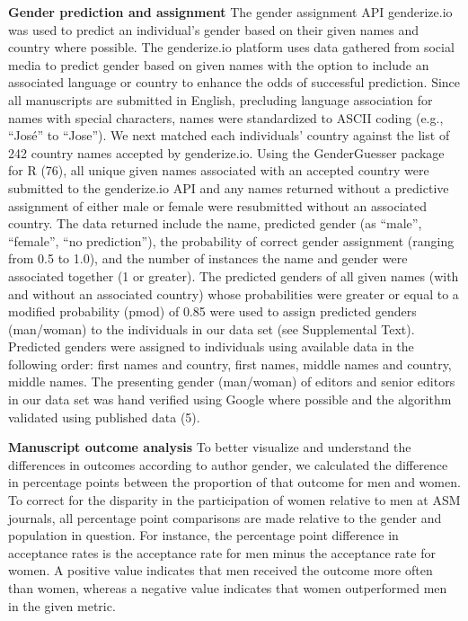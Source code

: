 \documentclass[11pt,]{article}
\begin{document}
\textbf{Gender prediction and assignment} The gender assignment API
genderize.io was used to predict an individual's gender based on their
given names and country where possible. The genderize.io platform uses
data gathered from social media to predict gender based on given names
with the option to include an associated language or country to enhance
the odds of successful prediction. Since all manuscripts are submitted
in English, precluding language association for names with special
characters, names were standardized to ASCII coding (e.g., ``José'' to
``Jose''). We next matched each individuals' country against the list of
242 country names accepted by genderize.io. Using the GenderGuesser
package for R (76), all unique given names associated with an accepted
country were submitted to the genderize.io API and any names returned
without a predictive assignment of either male or female were
resubmitted without an associated country. The data returned include the
name, predicted gender (as ``male'', ``female'', ``no prediction''), the
probability of correct gender assignment (ranging from 0.5 to 1.0), and
the number of instances the name and gender were associated together (1
or greater). The predicted genders of all given names (with and without
an associated country) whose probabilities were greater or equal to a
modified probability (pmod) of 0.85 were used to assign predicted
genders (man/woman) to the individuals in our data set (see Supplemental
Text). Predicted genders were assigned to individuals using available
data in the following order: first names and country, first names,
middle names and country, middle names. The presenting gender
(man/woman) of editors and senior editors in our data set was hand
verified using Google where possible and the algorithm validated using
published data (5).

\textbf{Manuscript outcome analysis} To better visualize and understand
the differences in outcomes according to author gender, we calculated
the difference in percentage points between the proportion of that
outcome for men and women. To correct for the disparity in the
participation of women relative to men at ASM journals, all percentage
point comparisons are made relative to the gender and population in
question. For instance, the percentage point difference in acceptance
rates is the acceptance rate for men minus the acceptance rate for
women. A positive value indicates that men received the outcome more
often than women, whereas a negative value indicates that women
outperformed men in the given metric.
\end{document}
